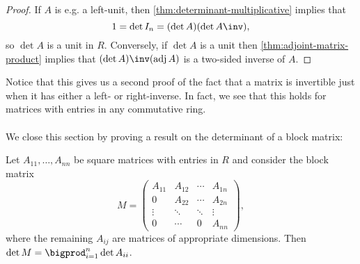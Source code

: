 \documentclass[a4paper, 11pt]{memoir}
\numberwithin{equation}{chapter}
\DeclareMathOperator{\adj}{adj}
\newcommand{\newpar}{\paragraph{}}
\begin{document}
\begin{proof}
    If $A$ is e.g. a left-unit, then \cref{thm:determinant-multiplicative} implies that
    \begin{equation*}
        1
            = \det I_n
            = (\det A)(\det A\inv),
    \end{equation*}
    so $\det A$ is a unit in $R$. Conversely, if $\det A$ is a unit then \cref{thm:adjoint-matrix-product} implies that $(\det A)\inv(\adj A)$ is a two-sided inverse of $A$.
\end{proof}

Notice that this gives us a second proof of the fact that a matrix is invertible just when it has either a left- or right-inverse. In fact, we see that this holds for matrices with entries in any commutative ring.


\newpar

We close this section by proving a result on the determinant of a block matrix:

\begin{proposition}
    \label{prop:block-matrix-determinant}
    Let $A_{11}, \ldots, A_{nn}$ be square matrices with entries in $R$ and consider the block matrix
    \begin{equation*}
        M
            = \begin{pmatrix}
                A_{11} & A_{12} & \cdots & A_{1n} \\
                0      & A_{22} & \cdots & A_{2n} \\
                \vdots & \ddots & \ddots & \vdots \\
                0      & \cdots & 0      & A_{nn}
            \end{pmatrix},
    \end{equation*}
    where the remaining $A_{ij}$ are matrices of appropriate dimensions. Then $\det M = \bigprod_{i=1}^n \det A_{ii}$.
\end{proposition}
\end{document}
